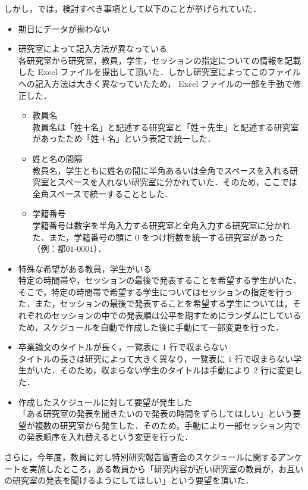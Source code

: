 \documentclass[a4paper,12pt,fleqn]{jarticle}
\begin{document}
しかし，\cite{wakabayasi}では，検討すべき事項として以下のことが挙げられていた．
\begin{itemize}
\item 期日にデータが揃わない
\item 研究室によって記入方法が異なっている\\
  各研究室から研究室，教員，学生，セッションの指定についての情報を記載した Excel ファイルを提出して頂いた．しかし研究室によってこのファイルへの記入方法は大きく異なっていたため， Excel ファイルの一部を手動で修正した．
  \begin{itemize}
  \item 教員名\\
    教員名は「姓＋名」と記述する研究室と「姓＋先生」と記述する研究室があったため「姓＋名」という表記で統一した．
  \item 姓と名の間隔\\
    教員名，学生ともに姓名の間に半角あるいは全角でスペースを入れる研究室とスペースを入れない研究室に分かれていた．そのため，ここでは全角スペースで統一することとした．
  \item 学籍番号\\
    学籍番号は数字を半角入力する研究室と全角入力する研究室に分かれた．また，学籍番号の頭に $0$ をつけ桁数を統一する研究室があった（例：都$01$-$0001$）．
  \end{itemize}
\item 特殊な希望がある教員，学生がいる\\
  特定の時間帯や，セッションの最後で発表することを希望する学生がいた．そこで，特定の時間帯で希望する学生についてはセッションの指定を行った．また，セッションの最後で発表することを希望する学生については，それぞれのセッションの中での発表順は公平を期すためにランダムにしているため，スケジュールを自動で作成した後に手動にて一部変更を行った．
\item 卒業論文のタイトルが長く，一覧表に $1$ 行で収まらない\\
  タイトルの長さは研究によって大きく異なり，一覧表に $1$ 行で収まらない学生がいた．そのため，収まらない学生のタイトルは手動により $2$ 行に変更した．
\item 作成したスケジュールに対して要望が発生した\\
  「ある研究室の発表を聞きたいので発表の時間をずらしてほしい」という要望が複数の研究室から発生した．そのため，手動により一部セッション内での発表順序を入れ替えるという変更を行った．
\end{itemize}

さらに，今年度，教員に対し特別研究報告審査会のスケジュールに関するアンケートを実施したところ，ある教員から「研究内容が近い研究室の教員が，お互いの研究室の発表を聞けるようにしてほしい」という要望を頂いた．
\end{document}
